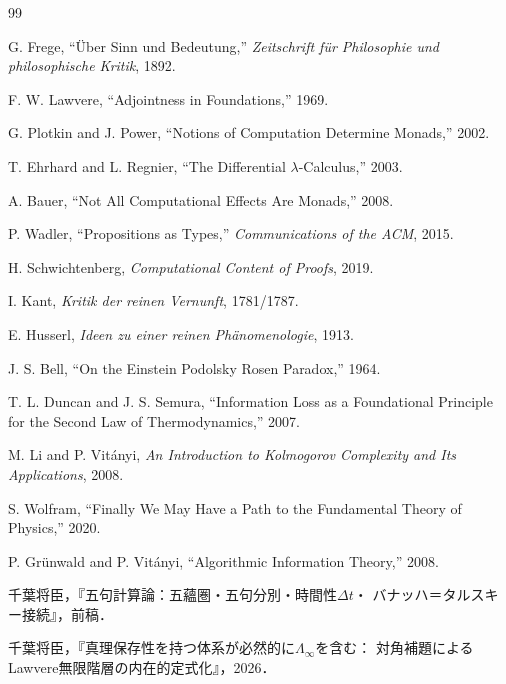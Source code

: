 \documentclass[11pt,a4paper]{ltjsarticle}
\theoremstyle{remark}
\newcommand{\dt}{\Delta t}
\newcommand{\LawvereInfinity}{\Lambda_\infty}
\begin{document}
\begin{thebibliography}{99}

G. Frege,
``Über Sinn und Bedeutung,''
\textit{Zeitschrift für Philosophie und philosophische Kritik}, 1892.

F. W. Lawvere,
``Adjointness in Foundations,'' 1969.

G. Plotkin and J. Power,
``Notions of Computation Determine Monads,'' 2002.

T. Ehrhard and L. Regnier,
``The Differential $\lambda$-Calculus,'' 2003.

A. Bauer,
``Not All Computational Effects Are Monads,'' 2008.

P. Wadler,
``Propositions as Types,''
\textit{Communications of the ACM}, 2015.

H. Schwichtenberg,
\textit{Computational Content of Proofs}, 2019.

I. Kant,
\textit{Kritik der reinen Vernunft}, 1781/1787.

E. Husserl,
\textit{Ideen zu einer reinen Phänomenologie}, 1913.

J. S. Bell,
``On the Einstein Podolsky Rosen Paradox,'' 1964.

T. L. Duncan and J. S. Semura,
``Information Loss as a Foundational Principle for the Second Law of
Thermodynamics,'' 2007.

M. Li and P. Vitányi,
\textit{An Introduction to Kolmogorov Complexity and Its Applications}, 2008.

S. Wolfram,
``Finally We May Have a Path to the Fundamental Theory of Physics,'' 2020.

P. Grünwald and P. Vitányi,
``Algorithmic Information Theory,'' 2008.

千葉将臣，『五句計算論：五蘊圏・五句分別・時間性$\dt$・
バナッハ＝タルスキー接続』，前稿．

千葉将臣，『真理保存性を持つ体系が必然的に$\LawvereInfinity$を含む：
対角補題によるLawvere無限階層の内在的定式化』，2026．

\end{thebibliography}
\end{document}
